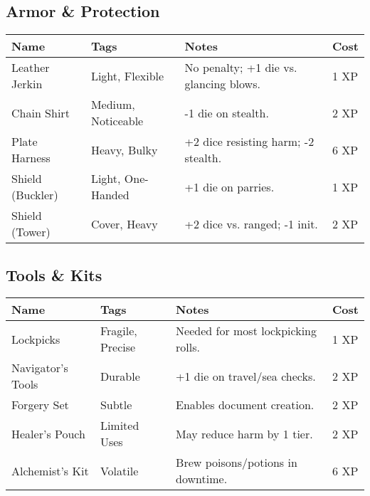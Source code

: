\documentclass[12pt]{article}
\begin{document}
\subsection*{Armor \& Protection}
\begin{tabular}{@{}llll@{}}
\toprule
\textbf{Name} & \textbf{Tags} & \textbf{Notes} & \textbf{Cost} \\
\midrule
Leather Jerkin & Light, Flexible & No penalty; +1 die vs. glancing blows. & 1 XP \\
Chain Shirt & Medium, Noticeable & -1 die on stealth. & 2 XP \\
Plate Harness & Heavy, Bulky & +2 dice resisting harm; -2 stealth. & 6 XP \\
Shield (Buckler) & Light, One-Handed & +1 die on parries. & 1 XP \\
Shield (Tower) & Cover, Heavy & +2 dice vs. ranged; -1 init. & 2 XP \\
\bottomrule
\end{tabular}

\subsection*{Tools \& Kits}
\begin{tabular}{@{}llll@{}}
\toprule
\textbf{Name} & \textbf{Tags} & \textbf{Notes} & \textbf{Cost} \\
\midrule
Lockpicks & Fragile, Precise & Needed for most lockpicking rolls. & 1 XP \\
Navigator’s Tools & Durable & +1 die on travel/sea checks. & 2 XP \\
Forgery Set & Subtle & Enables document creation. & 2 XP \\
Healer’s Pouch & Limited Uses & May reduce harm by 1 tier. & 2 XP \\
Alchemist’s Kit & Volatile & Brew poisons/potions in downtime. & 6 XP \\
\bottomrule
\end{tabular}
\end{document}
